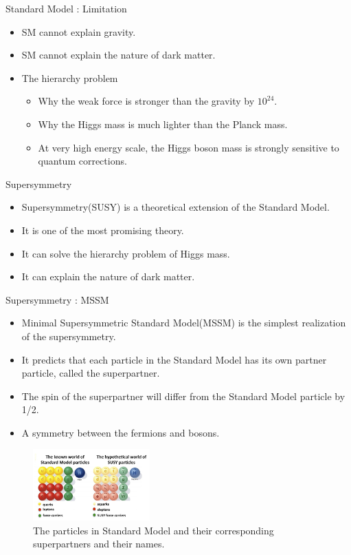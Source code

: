 \documentclass[mathserif,serif]{beamer}
\begin{document}
\begin{frame}{Standard Model : Limitation}
\begin{itemize}
\item SM cannot explain gravity.
\item SM cannot explain the nature of dark matter.
\item The hierarchy problem
\begin{itemize}
\item Why the weak force is stronger than the gravity by $10^{24}$.
\item Why the Higgs mass is much lighter than the Planck mass.
\item At very high energy scale, the Higgs boson mass is strongly sensitive to quantum corrections.
\end{itemize}
\end{itemize}
\end{frame}

\begin{frame}{Supersymmetry}
\begin{itemize}
\item Supersymmetry(SUSY) is a theoretical extension of the Standard Model.
\item It is one of the most promising theory.
\item It can solve the hierarchy problem of Higgs mass.
\item It can explain the nature of dark matter.
\end{itemize}
\end{frame}

\begin{frame}{Supersymmetry : MSSM}
\begin{itemize}
\item Minimal Supersymmetric Standard Model(MSSM) is the simplest realization of the supersymmetry.
\item It predicts that each particle in the Standard Model has its own partner particle, called the superpartner.
\item The spin of the superpartner will differ from the Standard Model particle by 1/2.
\item A symmetry between the fermions and bosons.
\end{itemize}
\begin{figure}
\centering
\includegraphics[width=0.4\textwidth]{data/photo/theory/SM-SUSY-diagram.jpg}
\caption{The particles in Standard Model and their corresponding superpartners and their names.}
\end{figure}
\end{frame}
\end{document}
